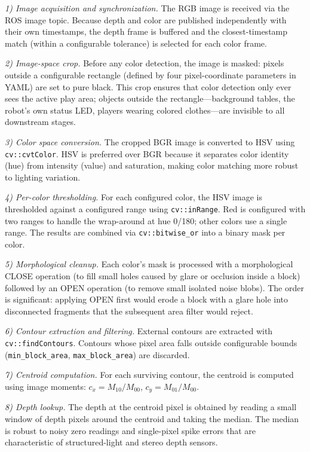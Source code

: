 \documentclass[conference]{IEEEtran}
\begin{document}
\textit{1) Image acquisition and synchronization.} The RGB image is
received via the ROS image topic. Because depth and color are published
independently with their own timestamps, the depth frame is buffered
and the closest-timestamp match (within a configurable tolerance) is
selected for each color frame.

\textit{2) Image-space crop.} Before any color detection, the image
is masked: pixels outside a configurable rectangle (defined by four
pixel-coordinate parameters in YAML) are set to pure black. This crop
ensures that color detection only ever sees the active play area;
objects outside the rectangle---background tables, the robot's own
status LED, players wearing colored clothes---are invisible to all
downstream stages.

\textit{3) Color space conversion.} The cropped BGR image is converted
to HSV using \texttt{cv::cvtColor}. HSV is preferred over BGR because
it separates color identity (hue) from intensity (value) and
saturation, making color matching more robust to lighting variation.

\textit{4) Per-color thresholding.} For each configured color, the
HSV image is thresholded against a configured range using
\texttt{cv::inRange}. Red is configured with two ranges to handle
the wrap-around at hue 0/180; other colors use a single range. The
results are combined via \texttt{cv::bitwise\_or} into a binary mask
per color.

\textit{5) Morphological cleanup.} Each color's mask is processed
with a morphological CLOSE operation (to fill small holes caused by
glare or occlusion inside a block) followed by an OPEN operation
(to remove small isolated noise blobs). The order is significant:
applying OPEN first would erode a block with a glare hole into
disconnected fragments that the subsequent area filter would reject.

\textit{6) Contour extraction and filtering.} External contours
are extracted with \texttt{cv::findContours}. Contours whose
pixel area falls outside configurable bounds (\texttt{min\_block\_area},
\texttt{max\_block\_area}) are discarded.

\textit{7) Centroid computation.} For each surviving contour, the
centroid is computed using image moments: $c_x = M_{10}/M_{00}$,
$c_y = M_{01}/M_{00}$.

\textit{8) Depth lookup.} The depth at the centroid pixel is obtained
by reading a small window of depth pixels around the centroid and
taking the median. The median is robust to noisy zero readings and
single-pixel spike errors that are characteristic of structured-light
and stereo depth sensors.
\end{document}
